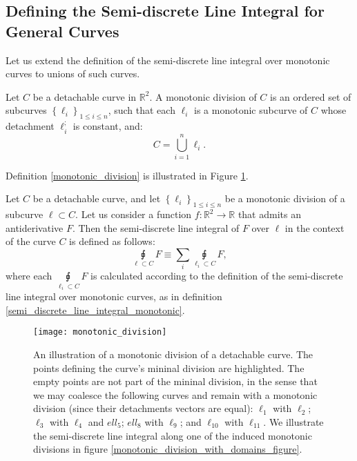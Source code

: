 \documentclass[11pt]{book}
\begin{document}
\subsection{Defining the Semi-discrete Line Integral for General Curves}
\label{semi_discrete_line_integral_general}
Let us extend the definition of the semi-discrete line integral over monotonic curves to unions of such curves.
\begin{definition}Let $C$ be a detachable curve in $\mathbb{R}^2$. A monotonic division of $C$ is an ordered set of subcurves $\left\{\ell_i\right\}_{1\leq i\leq n}$, such that each $\ell_i$ is a monotonic subcurve of $C$ whose detachment $\ell_i^;$ is constant, and:
\[C=\bigcup_{i=1}^{n}\ell_{i}.\]
\label{monotonic_division}
\end{definition}
Definition \ref{monotonic_division} is illustrated in Figure \ref{monotonic_division_figure}.
\begin{definition}
Let $C$ be a detachable curve, and let $\left\{\ell_i\right\}_{1\leq i\leq n}$ be a monotonic division of a subcurve $\ell\subset C$.  Let us consider a function $f:\mathbb{R}^2\rightarrow\mathbb{R}$ that admits an antiderivative $F$. Then the semi-discrete line integral of $F$ over $\ell$ in the context of the curve $C$ is defined as follows:
$$\underset{\ell\subset C}{\sqint}F\equiv\underset{i}{\sum}\underset{\ell_{i}\subset C}{\sqint}F,$$
where each $\underset{\ell_{i}\subset C}{\sqint}F$ is calculated according to the definition of the semi-discrete line integral over monotonic curves, as in definition \ref{semi_discrete_line_integral_monotonic}.
\end{definition}

\begin{figure}
\texttt{[image: monotonic\_division]}
\caption{An illustration of a monotonic division of a detachable curve. The points defining the curve's mininal division are highlighted. The empty points are not part of the mininal division, in the sense that we may coalesce the following curves and remain with a monotonic division (since their detachments vectors are equal): $\ell_1$ with $\ell_2$; $\ell_3$ with $\ell_4$ and $ell_5$;  $ ell_8$ with $\ell_9$; and $\ell_{10}$ with $\ell_{11}$. We illustrate the semi-discrete line integral along one of the induced monotonic divisions in figure \ref{monotonic_division_with_domains_figure}.}\label{monotonic_division_figure}
\end{figure}
\end{document}
